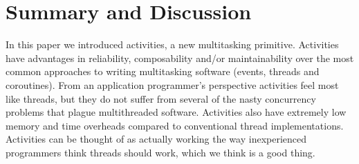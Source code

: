 \documentclass[a4paper,UKenglish,cleveref, autoref]{lipics-v2019}
\begin{document}
\section{Summary and Discussion}

In this paper we introduced activities, a new multitasking primitive.
Activities have advantages in reliability, composability and/or maintainability over the most common approaches to writing multitasking software (events, threads and coroutines).
From an application programmer's perspective activities feel most like threads, but they do not suffer from several of the nasty concurrency problems that plague multithreaded software.
Activities also have extremely low memory and time overheads compared to conventional thread implementations.
Activities can be thought of as actually working the way inexperienced programmers think threads should work, which we think is a good thing.




% 






\end{document}

